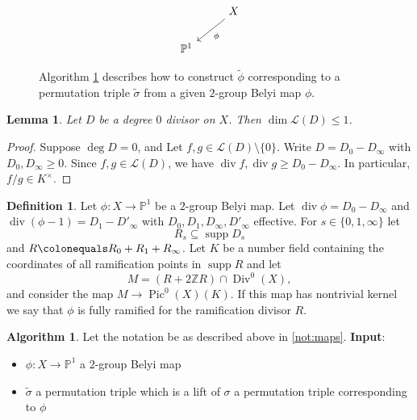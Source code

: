 \documentclass{dcthesis}
\newcommand{\PP}{\mathbb P}
\newcommand{\ZZ}{\mathbb Z}
\newcommand{\defi}[1]{\textsf{#1}}
\newcommand{\wt}[1]{\widetilde{#1}}
\newcommand{\LL}{\mathscr L}
\DeclareMathOperator{\Div}{Div}
\DeclareMathOperator{\Pic}{Pic}
\DeclareMathOperator{\ddiv}{div}
\DeclareMathOperator{\ddeg}{deg}
\DeclareMathOperator{\ddim}{dim}
\DeclareMathOperator{\supp}{supp}
\numberwithin{equation}{section}
\newtheorem{lemma}[equation]{Lemma}
\theoremstyle{definition}
\newtheorem{definition}[equation]{Definition}
\newtheorem{alg}[equation]{Algorithm}
\theoremstyle{remark}
\begin{document}
{{\begin{figure}[ht]
\[\begin{tikzcd}[ampersand replacement=\&]
          \&X\arrow{dl}{\phi}\\
          \PP^1
        \end{tikzcd}
      \]
      \caption{
      Algorithm \ref{alg:lift} describes how to construct $\wt{\phi}$
        corresponding to a permutation triple $\wt{\sigma}$
        from a given $2$-group Belyi map $\phi$.
      }
    \end{figure}
    \begin{lemma}\label{lem:1dim}
      Let $D$ be a degree $0$ divisor on $X$.
      Then $\ddim\LL(D) \leq 1$.
    \end{lemma}
    \begin{proof}
      Suppose $\ddeg D = 0$, and
      Let $f,g\in\LL(D)\setminus\{0\}$.
      Write $D=D_0-D_\infty$ with $D_0,D_\infty\geq 0$.
      Since $f,g\in\LL(D)$, we have
      $\ddiv f,\ddiv g\geq D_0-D_\infty$.
      In particular,
      $f/g\in K^\times$.
    \end{proof}
    \begin{definition}
      \label{def:ramificationful}
      Let $\phi\colon X\to\PP^1$ be a $2$-group Belyi map.
      Let $\ddiv\phi = D_0-D_\infty$
      and $\ddiv(\phi-1) = D_1 - D'_\infty$
      with $D_0, D_1, D_\infty, D'_\infty$ effective.
      For $s\in\{0,1,\infty\}$ let
      \[
        R_s \subseteq \supp D_s
      \]
      and $R\colonequals R_0+R_1+R_\infty$.
      Let $K$ be a number field
      containing the coordinates of
      all ramification points in $\supp R$
      and
      let
      \begin{equation}
        \label{eqn:ramificationful}
        M = (R+2\ZZ R)\cap\Div^0(X),
      \end{equation}
      and consider the map
      $M\to\Pic^0(X)(K)$.
      If this map has nontrivial kernel we say that
      $\phi$ is
      \defi{fully ramified for the ramification divisor $R$}.
    \end{definition}
    \begin{alg}\label{alg:lift}
      Let the notation be as described above in \ref{not:maps}.
      \newline
      \textbf{Input}:
      \begin{itemize}
        \item 
          $\phi:X\to\PP^1$ a $2$-group Belyi map
        \item
          $\wt{\sigma}$ a permutation triple which is a lift
          of $\sigma$ a permutation triple corresponding to $\phi$

\end{itemize}
\end{alg}}}
\end{document}
